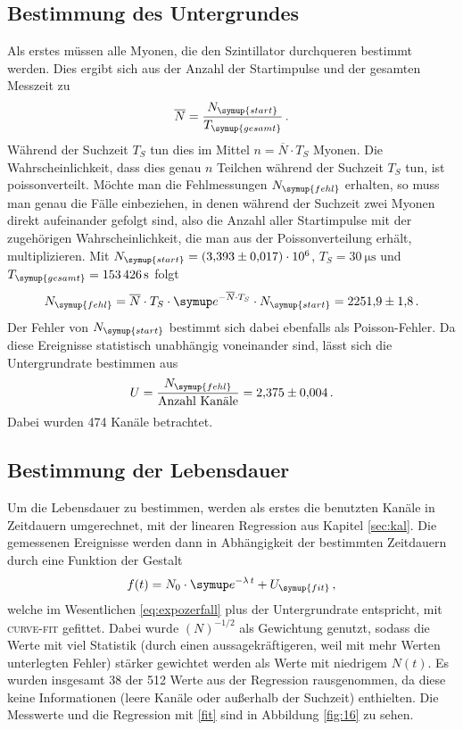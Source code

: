 \documentclass[
  bibliography=totoc,     %
  captions=tableheading,  %
  titlepage=firstiscover, %
]{scrartcl}
\begin{document}
\subsection{Bestimmung des Untergrundes}
Als erstes müssen alle Myonen, die den Szintillator durchqueren bestimmt werden.
Dies ergibt sich aus der Anzahl der Startimpulse und der gesamten Messzeit zu
\begin{equation}
  \overline{N} = \frac{N_{\symup{start}}}{T_{\symup{gesamt}}} \, .
\end{equation}
Während der Suchzeit $T_S$ tun dies im Mittel $n = \overline{N} \cdot T_S$ Myonen.
Die Wahrscheinlichkeit, dass dies genau $n$ Teilchen während der Suchzeit $T_S$
tun, ist poissonverteilt. Möchte man die Fehlmessungen $N_{\symup{fehl}}$
erhalten, so muss man genau die Fälle einbeziehen, in denen während der Suchzeit
zwei Myonen direkt aufeinander gefolgt sind, also die Anzahl aller Startimpulse
mit der zugehörigen Wahrscheinlichkeit, die man aus der Poissonverteilung
erhält, multiplizieren.
Mit $N_{\symup{start}} = \num{3.393(17)e6}$, $T_S = \SI{30}{\micro\second}$ und $T_{\symup{gesamt}}
= \SI{153426}{\second}$ folgt
\begin{equation}
  N_{\symup{fehl}} = \overline{N} \cdot T_S \cdot \symup e^{- \overline{N} \cdot T_S}
  \cdot N_{\symup{start}} = \num{2251.9(18)} \, .
\end{equation}
Der Fehler von $N_{\symup{start}}$ bestimmt sich dabei ebenfalls als Poisson-Fehler.
Da diese Ereignisse statistisch unabhängig voneinander sind, lässt sich die Untergrundrate
bestimmen aus
\begin{equation}
  U = \frac{N_{\symup{fehl}}}{\text{Anzahl Kanäle}} = \num{2.375(04)} \, .
\end{equation}
Dabei wurden 474 Kanäle betrachtet.
\subsection{Bestimmung der Lebensdauer}
Um die Lebensdauer zu bestimmen, werden als erstes die benutzten Kanäle in Zeitdauern
umgerechnet, mit der linearen Regression aus Kapitel \ref{sec:kal}. Die gemessenen
Ereignisse werden dann in Abhängigkeit der bestimmten Zeitdauern
durch eine Funktion der Gestalt
\begin{equation}
  f(t) = N_0 \cdot \symup e^{-\lambda \, t} + U_{\symup{fit}} \, ,
  \label{fit}
\end{equation}
welche im Wesentlichen \eqref{eq:expozerfall} plus der Untergrundrate entspricht,
mit \textsc{curve-fit} gefittet. Dabei wurde $(N)^{-1/2}$ als Gewichtung
genutzt, sodass die Werte mit viel Statistik (durch einen aussagekräftigeren, weil
mit mehr Werten unterlegten Fehler) stärker gewichtet werden als Werte mit niedrigem
$N(t)$. Es wurden insgesamt 38 der 512 Werte aus der Regression rausgenommen,
da diese keine Informationen (leere Kanäle oder außerhalb der Suchzeit) enthielten.
Die Messwerte und die Regression mit \eqref{fit} sind in
Abbildung \ref{fig:16} zu sehen.
\end{document}
